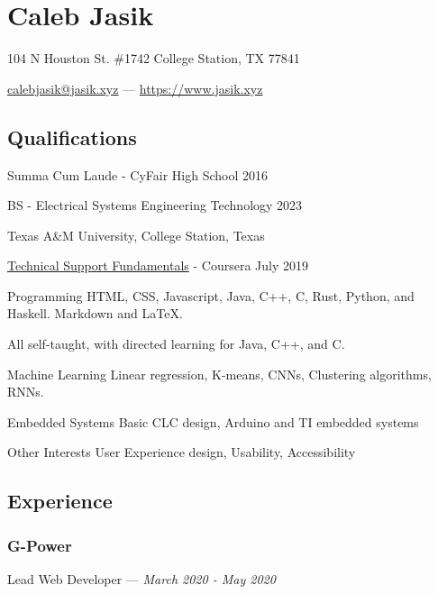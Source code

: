\documentclass[letterpaper,10pt]{article}
\begin{document}
    \section{\Huge Caleb Jasik}\label{sec:hugecaleb-jasik}

    \hfill 104 N Houston St. \#1742 College Station, TX 77841

    \hfill \href{mailto:calebjasik@jasik.xyz}{calebjasik@jasik.xyz} ---
    \href{https://jasik.xyz}{https://www.jasik.xyz}

    \subsection{Qualifications}\label{subsec:qualifications}

    Summa Cum Laude - CyFair High School 2016

    BS - Electrical Systems Engineering Technology 2023

    Texas A\&M University, College Station, Texas

    \href{https://www.coursera.org/account/accomplishments/verify/GZEYJ5VA2YGH}{Technical Support Fundamentals} - Coursera July 2019

    \begin{skills}
        \item[Programming]
        HTML, CSS, Javascript, Java, C++, C, Rust, Python, and Haskell. Markdown and LaTeX.

        All self-taught, with directed learning for Java, C++, and C\@.
        \item[Machine Learning]
        Linear regression, K-means, CNNs, Clustering algorithms, RNNs.
        \item[Embedded Systems]
        Basic CLC design, Arduino and TI embedded systems
        \item[Other Interests]
        User Experience design, Usability, Accessibility
    \end{skills}


    \subsection{Experience}\label{subsec:experience}

    \subsubsection{G-Power}
    \hfill Lead Web Developer --- \emph{March 2020 - May 2020}
\end{document}
